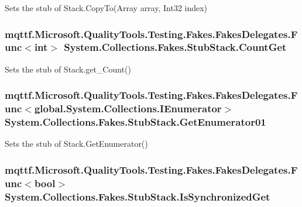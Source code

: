 Sets the stub of Stack.\-Copy\-To(\-Array array, Int32 index)

\hypertarget{class_system_1_1_collections_1_1_fakes_1_1_stub_stack_a74b8c7f9cfe397338bf5708bbae44c46}{
\subsubsection[{Count\-Get}]{\setlength{\rightskip}{0pt plus 5cm}mqttf.\-Microsoft.\-Quality\-Tools.\-Testing.\-Fakes.\-Fakes\-Delegates.\-Func$<$int$>$ System.\-Collections.\-Fakes.\-Stub\-Stack.\-Count\-Get}}\label{class_system_1_1_collections_1_1_fakes_1_1_stub_stack_a74b8c7f9cfe397338bf5708bbae44c46}


Sets the stub of Stack.\-get\-\_\-\-Count()

\hypertarget{class_system_1_1_collections_1_1_fakes_1_1_stub_stack_aef2bc51e4e5017460ec8bc7de0560b2a}{
\subsubsection[{Get\-Enumerator01}]{\setlength{\rightskip}{0pt plus 5cm}mqttf.\-Microsoft.\-Quality\-Tools.\-Testing.\-Fakes.\-Fakes\-Delegates.\-Func$<$global.\-System.\-Collections.\-I\-Enumerator$>$ System.\-Collections.\-Fakes.\-Stub\-Stack.\-Get\-Enumerator01}}\label{class_system_1_1_collections_1_1_fakes_1_1_stub_stack_aef2bc51e4e5017460ec8bc7de0560b2a}


Sets the stub of Stack.\-Get\-Enumerator()

\hypertarget{class_system_1_1_collections_1_1_fakes_1_1_stub_stack_a203274e29ac8014d7d049b947282cc75}{
\subsubsection[{Is\-Synchronized\-Get}]{\setlength{\rightskip}{0pt plus 5cm}mqttf.\-Microsoft.\-Quality\-Tools.\-Testing.\-Fakes.\-Fakes\-Delegates.\-Func$<$bool$>$ System.\-Collections.\-Fakes.\-Stub\-Stack.\-Is\-Synchronized\-Get}}\label{class_system_1_1_collections_1_1_fakes_1_1_stub_stack_a203274e29ac8014d7d049b947282cc75}


